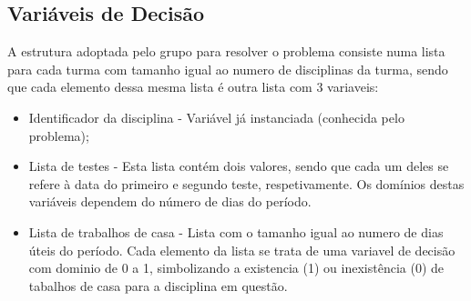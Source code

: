 \documentclass{llncs}
\begin{document}
\subsection{Variáveis de Decisão}
A estrutura adoptada pelo grupo para resolver o problema consiste numa lista para cada turma com tamanho igual ao numero de disciplinas da turma, sendo que cada elemento dessa mesma lista é outra lista com 3 variaveis: 
\begin{itemize}
	\item Identificador da disciplina - Variável já instanciada (conhecida pelo problema);
	\item Lista de testes - Esta lista contém dois valores, sendo que cada um deles se refere à data do primeiro e segundo teste, respetivamente. Os domínios destas variáveis dependem do número de dias do período.
	\item Lista de trabalhos de casa - Lista com o tamanho igual ao numero de dias úteis do período. Cada elemento da lista se trata de uma variavel de decisão com dominio de 0 a 1, simbolizando a existencia (1) ou inexistência (0) de tabalhos de casa para a disciplina em questão.
\end{itemize}
\end{document}
